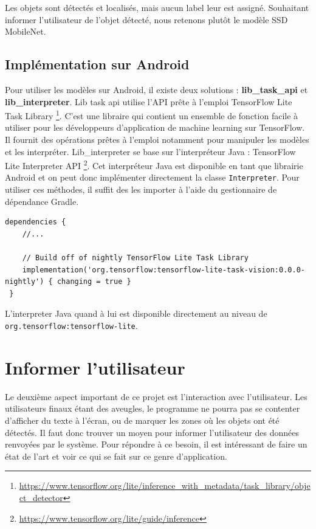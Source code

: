 \documentclass[UTF8]{EPURapport}
\begin{document}
Les objets sont détectés et localisés, mais aucun label leur est assigné. Souhaitant informer l'utilisateur de l'objet détecté, nous retenons plutôt le modèle SSD MobileNet.

\subsection{Implémentation sur Android}
Pour utiliser les modèles sur Android, il existe deux solutions : \textbf{lib\_task\_api} et \textbf{lib\_interpreter}. Lib task api utilise l'API prête à l'emploi TensorFlow Lite Task Library \footnote{\url{https://www.tensorflow.org/lite/inference_with_metadata/task_library/object_detector}}. C'est une libraire qui contient un ensemble de fonction facile à utiliser pour les développeurs d'application de machine learning sur TensorFlow. Il fournit des opérations prêtes à l'emploi notamment pour manipuler les modèles et les interpréter. Lib\_interpreter se base sur l'interpréteur Java : TensorFlow Lite Interpreter API \footnote{\url{https://www.tensorflow.org/lite/guide/inference}}. Cet interpréteur Java est disponible en tant que librairie Android et on peut donc implémenter directement la classe \verb|Interpreter|.
Pour utiliser ces méthodes, il suffit des les importer à l'aide du gestionnaire de dépendance Gradle.
\begin{lstlisting}
dependencies {
    //...

    // Build off of nightly TensorFlow Lite Task Library
    implementation('org.tensorflow:tensorflow-lite-task-vision:0.0.0-nightly') { changing = true }
 }
\end{lstlisting}

L'interpreter Java quand à lui est disponible directement au niveau de \\ \verb|org.tensorflow:tensorflow-lite|.

\section{Informer l'utilisateur}
Le deuxième aspect important de ce projet est l'interaction avec l'utilisateur. Les utilisateurs finaux étant des aveugles, le programme ne pourra pas se contenter d'afficher du texte à l'écran, ou de marquer les zones où les objets ont été détectés. Il faut donc trouver un moyen pour informer l'utilisateur des données renvoyées par le système. Pour répondre à ce besoin, il est intéressant de faire un état de l'art et voir ce qui se fait sur ce genre d'application.
\end{document}
